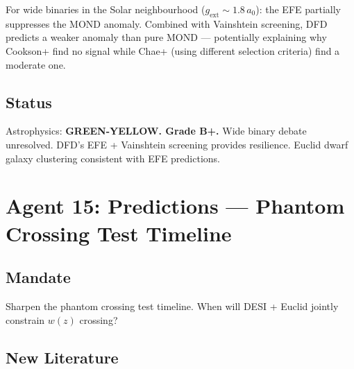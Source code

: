 \documentclass[11pt,a4paper]{article}
\begin{document}
For wide binaries in the Solar neighbourhood ($g_\mathrm{ext} \sim 1.8\,a_0$): the EFE partially suppresses the MOND anomaly. Combined with Vainshtein screening, DFD predicts a weaker anomaly than pure MOND --- potentially explaining why Cookson+ find no signal while Chae+ (using different selection criteria) find a moderate one.

\subsection{Status}
Astrophysics: \textbf{GREEN-YELLOW. Grade B+.} Wide binary debate unresolved. DFD's EFE + Vainshtein screening provides resilience. Euclid dwarf galaxy clustering consistent with EFE predictions.

\section{Agent 15: Predictions --- Phantom Crossing Test Timeline}

\subsection{Mandate}
Sharpen the phantom crossing test timeline. When will DESI + Euclid jointly constrain $w(z)$ crossing?

\subsection{New Literature}
\end{document}
